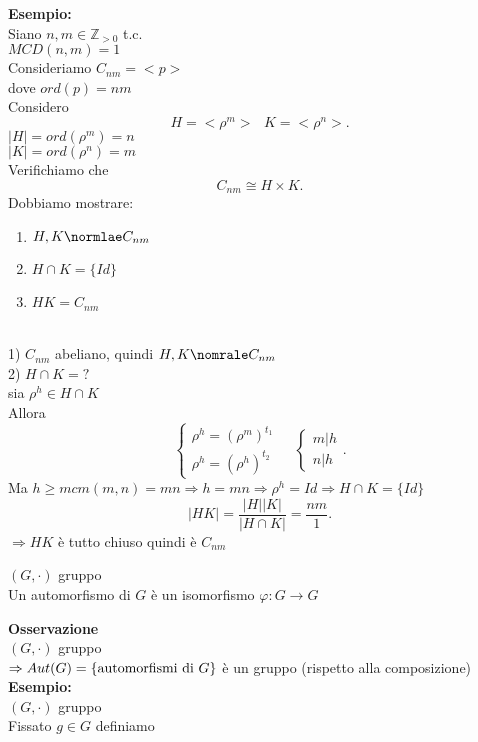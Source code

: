 \documentclass[12px]{article}
\begin{document}
\textbf{Esempio:}\\
Siano $n,m\in\mathbb Z_{>0}$ t.c.\\
$MCD(n,m) = 1$\\
Consideriamo  $C_{nm} = <p>$\\
dove  $ord(p) = nm$\\
Considero
 \[
H = <\rho^m> \ \ \ K = <\rho^n>
.\] 
$|H| = ord(\rho^m) = n$\\
$|K| = ord(\rho^n) = m$\\
Verifichiamo che
 \[
	 C_{nm} \cong H\times K
.\] 
Dobbiamo mostrare:
\begin{enumerate}
	\item $H,K\normlae C_{nm}$\\
	\item $H\cap K = \{Id\}$\\
	\item $HK = C_{nm}$
	
\end{enumerate}\\
1) $C_{nm}$ abeliano, quindi $H,K\nomrale C_{nm}$\\
2) $H\cap K = ?$\\
sia $\rho^h\in H\cap K$\\
Allora
 \[
\begin{cases}
	\rho^h = (\rho^m)^{t_1}\\
	\rho^h = (\rho^h)^{t_2}
\end{cases} \ \ \ \ \ \begin{cases}
	m|h\\
	n|h
\end{cases}
.\] 
Ma $h\geq mcm(m,n) = mn \Rightarrow  h = mn \Rightarrow \rho^h = Id \Rightarrow H\cap K = \{Id\}$
\[
	|HK| = \frac{|H||K|}{|H\cap K|} = \frac {nm}1
.\] 
$ \Rightarrow HK$ è tutto chiuso quindi è $C_{nm}$\\
\begin{defi}[Automorfismo]
	$(G,\cdot)$ gruppo\\
	Un automorfismo di $G$ è un isomorfismo  $ \varphi:G \rightarrow G$
\end{defi}
\textbf{Osservazione}\\
$(G,\cdot)$ gruppo\\
$ \Rightarrow Aut(G) = \{\text{automorfismi di } G\}\\$
è un gruppo (rispetto alla composizione)\\
\textbf{Esempio:}\\
$(G,\cdot)$ gruppo\\
Fissato $g\in G$ definiamo\\
\end{document}
